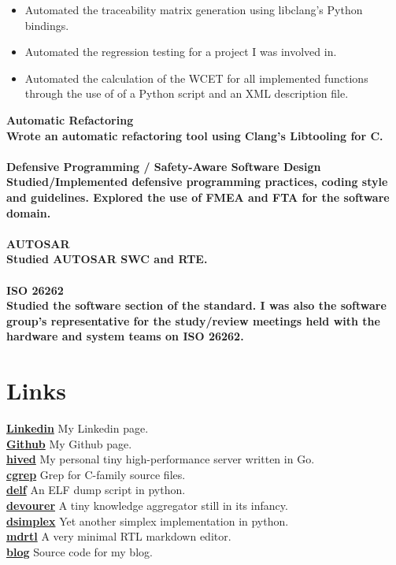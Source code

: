 \documentclass[8pt]{article}
\begin{document}
\begin{multicols}{2}
\begin{itemize}
\item Automated the traceability matrix generation using libclang's Python bindings.
\item Automated the regression testing for a project I was involved in.
\item Automated the calculation of the WCET for all implemented functions through the use of of a Python script and an XML description file.
  \end{itemize}
  \bf Automatic Refactoring\\ \normalfont Wrote an automatic refactoring tool using Clang's Libtooling for C.\\[5pt]
  \\
  \bf Defensive Programming / Safety-Aware Software Design\\ \normalfont Studied/Implemented defensive programming practices, coding style and guidelines. Explored the use of FMEA and FTA for the software domain.\\[5pt]
  \\
  \bf AUTOSAR\\ \normalfont Studied AUTOSAR SWC and RTE.\\[5pt]
  \\
  \bf ISO 26262\\ \normalfont Studied the software section of the standard. I was also the software group's representative for the study/review meetings held with the hardware and system teams on ISO 26262.\\[5pt]

  \section*{Links}
  {\bf \href{https://www.linkedin.com/in/farzad-sadeghi/}{Linkedin}} My Linkedin page.\\[5pt]
  {\bf \href{https://github.com/terminaldweller}{Github}} My Github page.\\[5pt]
  {\bf \href{https://github.com/terminaldweller/hived}{hived}} My personal tiny high-performance server written in Go.\\[5pt]
  {\bf \href{https://github.com/terminaldweller/cgrep}{cgrep}} Grep for C-family source files.\\[5pt]
  {\bf \href{https://github.com/terminaldweller/delf}{delf}} An ELF dump script in python.\\[5pt]
  {\bf \href{https://github.com/terminaldweller/devourer}{devourer}} A tiny knowledge aggregator still in its infancy.\\[5pt]
  {\bf \href{https://github.com/terminaldweller/simplex}{dsimplex}} Yet another simplex implementation in python.\\[5pt]
  {\bf \href{https://github.com/terminaldweller/mdrtl}{mdrtl}} A very minimal RTL markdown editor.\\[5pt]
  {\bf \href{https://github.com/terminaldweller/blog}{blog}} Source code for my blog.\\[5pt]

\end{multicols}
\end{document}
